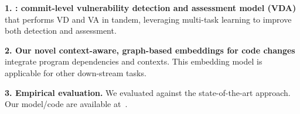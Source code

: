 {\bf 1. {\tool}: commit-level vulnerability detection and assessment
  model (VDA)} that performs VD and VA in tandem, leveraging multi-task
learning to improve both detection and assessment.


{\bf 2. Our novel context-aware, graph-based embeddings for code
  changes}
integrate program dependencies and contexts. This embedding model
is applicable for other down-stream tasks.


{\bf 3. Empirical evaluation.} We evaluated {\tool}
against the state-of-the-art approach.
Our model/code are available at~\cite{cat-website}.

